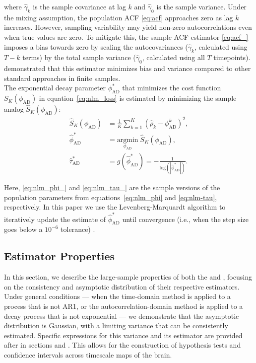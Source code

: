 \documentclass[9pt]{article}
\newcommand{\phiad}{\phi_{\scriptscriptstyle\text{AD}}}
\newcommand{\hatphiad}{\hat{\phi}^*_{\scriptscriptstyle\text{AD}}}
\newcommand{\hattauad}{\hat{\tau}^*_{\scriptscriptstyle\text{AD}}}
\begin{document}
\noindent where $\hat\gamma_k$ is the sample covariance at lag $k$ and $\hat\gamma_0$ is the sample variance. Under the mixing assumption, the population ACF \eqref{eq:acf} approaches zero as lag $k$ increases. However, sampling variability may yield non-zero autocorrelations even when true values are zero. To mitigate this, the sample ACF estimator \eqref{eq:acf_} imposes a bias towards zero by scaling the autocovariances ($\hat \gamma_k$, calculated using $T-k$ terms) by the total sample variance ($\hat\gamma_0$, calculated using all $T$ timepoints). \citet{marriott_bias_1954} demonstrated that this estimator minimizes bias and variance compared to other standard approaches in finite samples.\\

The exponential decay parameter $\phiad^*$ that minimizes the cost function $S_K(\phiad)$ in equation~\eqref{eq:nlm_loss} is estimated by minimizing the sample analog $\widehat{S}_{K}(\phiad)$:
\begin{align}
    \widehat{S}_{K}(\phiad) &= \frac{1}{K} \sum_{k=1}^K (\hat\rho_k - \phiad^k)^2,\label{eq:nlm_loss_}\\
    \hatphiad &= \underset{\phiad}{\text{argmin}} \; \widehat{S}_{K}(\phiad), \label{eq:nlm_phi_}\\
    \hattauad &= g(\hatphiad) = -\frac{1}{\text{log}(|\hatphiad|)}.\label{eq:nlm_tau_}
\end{align}

\noindent Here, \eqref{eq:nlm_phi_} and \eqref{eq:nlm_tau_} are the sample versions of the population parameters from equations~\eqref{eq:nlm_phi} and \eqref{eq:nlm-tau}, respectively. In this paper we use the Levenberg-Marquardt algorithm to iteratively update the estimate of $\hatphiad$ until convergence (i.e., when the step size goes below a $10^{-6}$ tolerance) \citep{levenberg_method_1944}.

\subsection{Estimator Properties}\label{sec:estimator-properties}
In this section, we describe the large-sample properties of both the  and , focusing on the consistency and asymptotic distribution of their respective estimators. Under general conditions --- when the time-domain method is applied to a process that is not AR1, or the autocorrelation-domain method is applied to a decay process that is not exponential --- we demonstrate that the asymptotic distribution is Gaussian, with a limiting variance that can be consistently estimated. Specific expressions for this variance and its estimator are provided after in sections  and . This allows for the construction of hypothesis tests and confidence intervals across timescale maps of the brain.
\end{document}
